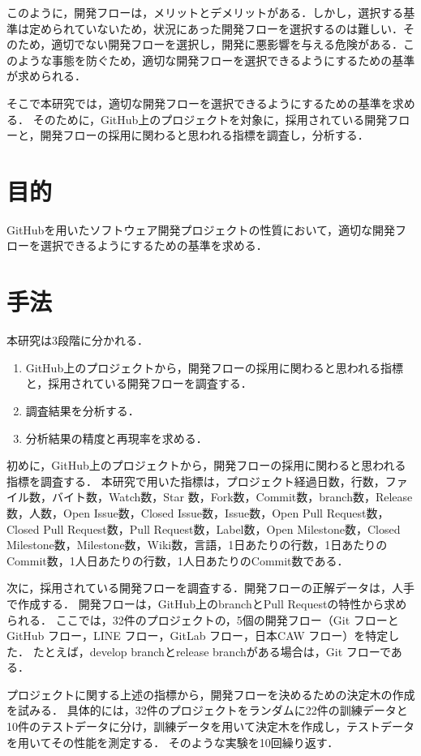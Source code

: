 \documentclass[uplatex,twocolumn]{jsarticle}
\begin{document}
このように，開発フローは，メリットとデメリットがある．しかし，選択する基準は定められていないため，状況にあった開発フローを選択するのは難しい．そのため，適切でない開発フローを選択し，開発に悪影響を与える危険がある．このような事態を防ぐため，適切な開発フローを選択できるようにするための基準が求められる．


そこで本研究では，適切な開発フローを選択できるようにするための基準を求める．
そのために，GitHub上のプロジェクトを対象に，採用されている開発フローと，開発フローの採用に関わると思われる指標を調査し，分析する．

\section{目的}

GitHubを用いたソフトウェア開発プロジェクトの性質において，適切な開発フローを選択できるようにするための基準を求める．

\section{手法}


本研究は3段階に分かれる．
\begin{enumerate}
\item GitHub上のプロジェクトから，開発フローの採用に関わると思われる指標と，採用されている開発フローを調査する．
\item 調査結果を分析する．
\item 分析結果の精度と再現率を求める． 
\end{enumerate}

初めに，GitHub上のプロジェクトから，開発フローの採用に関わると思われる指標を調査する．
本研究で用いた指標は，プロジェクト経過日数，行数，ファイル数，バイト数，Watch数，Star 数，Fork数，Commit数，branch数，Release数，人数，Open Issue数，Closed Issue数，Issue数，Open Pull Request数，Closed Pull Request数，Pull Request数，Label数，Open Milestone数，Closed Milestone数，Milestone数，Wiki数，言語，1日あたりの行数，1日あたりのCommit数，1人日あたりの行数，1人日あたりのCommit数である．

次に，採用されている開発フローを調査する．開発フローの正解データは，人手で作成する．
開発フローは，GitHub上のbranchとPull Requestの特性から求められる．
ここでは，32件のプロジェクトの，5個の開発フロー（Git フローとGitHub フロー，LINE フロー，GitLab フロー，日本CAW フロー）を特定した．
たとえば，develop branchとrelease branchがある場合は，Git フローである．

プロジェクトに関する上述の指標から，開発フローを決めるための決定木の作成を試みる．
具体的には，32件のプロジェクトをランダムに22件の訓練データと10件のテストデータに分け，訓練データを用いて決定木を作成し，テストデータを用いてその性能を測定する．
そのような実験を10回繰り返す．
\end{document}
